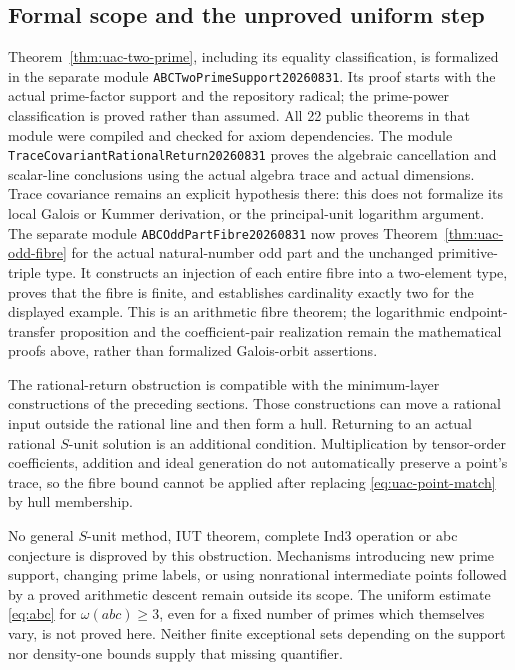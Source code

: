 \subsection{Formal scope and the unproved uniform step}

Theorem~\ref{thm:uac-two-prime}, including its equality classification,
is formalized in the separate module
\texttt{ABCTwoPrimeSupport20260831}. Its proof starts with the actual
prime-factor support and the repository radical; the prime-power
classification is proved rather than assumed. All 22 public theorems
in that module were compiled and checked for axiom dependencies.
The module \texttt{TraceCovariantRationalReturn20260831} proves the
algebraic cancellation and scalar-line conclusions using the actual
algebra trace and actual dimensions. Trace covariance remains an
explicit hypothesis there: this does not formalize its local Galois
or Kummer derivation, or the principal-unit logarithm argument.
The separate module \texttt{ABCOddPartFibre20260831} now proves
Theorem~\ref{thm:uac-odd-fibre} for the actual natural-number odd part
and the unchanged primitive-triple type. It constructs an injection
of each entire fibre into a two-element type, proves that the fibre
is finite, and establishes cardinality exactly two for the displayed
example. This is an arithmetic fibre theorem; the logarithmic
endpoint-transfer proposition and the coefficient-pair realization
remain the mathematical proofs above, rather than formalized
Galois-orbit assertions.

The rational-return obstruction is compatible with the minimum-layer
constructions of the preceding sections. Those constructions can move
a rational input outside the rational line and then form a hull.
Returning to an actual rational $S$-unit solution is an additional
condition. Multiplication by tensor-order coefficients, addition and
ideal generation do not automatically preserve a point's trace, so
the fibre bound cannot be applied after replacing
\eqref{eq:uac-point-match} by hull membership.

No general $S$-unit method, IUT theorem, complete Ind3 operation or abc
conjecture is disproved by this obstruction. Mechanisms introducing new
prime support, changing prime labels, or using nonrational intermediate
points followed by a proved arithmetic descent remain outside its
scope. The uniform estimate \eqref{eq:abc} for $\omega(abc)\ge3$,
even for a fixed number of primes which themselves vary, is not proved
here. Neither finite exceptional sets depending on the support nor
density-one bounds supply that missing quantifier.
